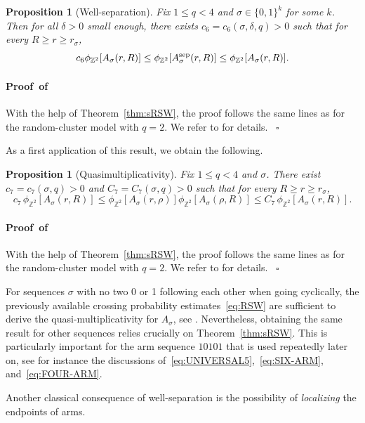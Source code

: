 \documentclass[a4paper,oneside,11pt]{article}
\newtheorem{proposition}[theorem]{Proposition}
\numberwithin{equation}{section}
\numberwithin{equation}{section}
\numberwithin{equation}{section}
\newenvironment{proof}[1][\relax]%
  {\paragraph{Proof\ifx#1\relax\else~of #1\fi}}%
  {~\hfill$\square$\par\bigskip}
\newcommand{\bbZ}{\mathbb{Z}}
\begin{document}
\begin{proposition}[Well-separation]\label{prop:separation}
Fix $1\le q<4$ and $\sigma \in \{0,1\}^k$ for some $k$. Then for all $\delta >0$ small enough, there exists $c_6=c_6(\sigma,\delta,q)>0$ such that for every $R\ge r\ge r_\sigma$,
\begin{equation}
c_6 \phi_{\bbZ^2}[A_{\sigma}(r,R)]\le \phi_{\bbZ^2}[A_{\sigma}^{\rm sep}(r,R)]\le  \phi_{\bbZ^2}[A_{\sigma}(r,R)].
\end{equation}
\end{proposition}

\begin{proof}
With the help of Theorem~\ref{thm:sRSW}, the proof follows the same lines as for the random-cluster model with $q=2$. We refer to \cite{CheDumHon13} for details.
\end{proof}

As a first application of this result, we obtain the following.

\begin{proposition}[Quasimultiplicativity]\label{prop:quasimultiplicativity}
  Fix  $1\le q< 4$ and $\sigma$. There exist $c_7=c_7(\sigma,q)>0$ and $C_7=C_7(\sigma,q)>0$ such that for every $R\ge r\ge r_\sigma$,
 \begin{equation}\label{eq:MULTIPLICATIVITY}
c_7\,\phi_{\bbZ^2}[A_{\sigma}(r,R)] \le \phi_{\bbZ^2}[A_{\sigma}(r,\rho)]\phi_{\bbZ^2}[A_{\sigma}(\rho,R)] \le C_7\,\phi_{\bbZ^2}[A_{\sigma}(r,R)].
  \end{equation}
  \end{proposition}

\begin{proof}
With the help of Theorem~\ref{thm:sRSW}, the proof follows the same lines as for the random-cluster model with $q=2$. We refer to \cite{CheDumHon13} for details.
\end{proof}

For sequences $\sigma$ with no two 0 or 1 following each other when going cyclically, the previously available crossing probability estimates~\eqref{eq:RSW} are sufficient to derive the quasi-multiplicativity for $A_{\sigma}$, see \cite{Wu}. Nevertheless, obtaining the same result for other sequences relies crucially on 
Theorem~\ref{thm:sRSW}.  This is particularly important for the arm sequence $10101$ that is used repeatedly later on, see for instance the discussions of~\eqref{eq:UNIVERSAL5},~\eqref{eq:SIX-ARM}, and~\eqref{eq:FOUR-ARM}.

Another classical consequence of well-separation is the possibility of {\em localizing} the endpoints of arms.
\end{document}
